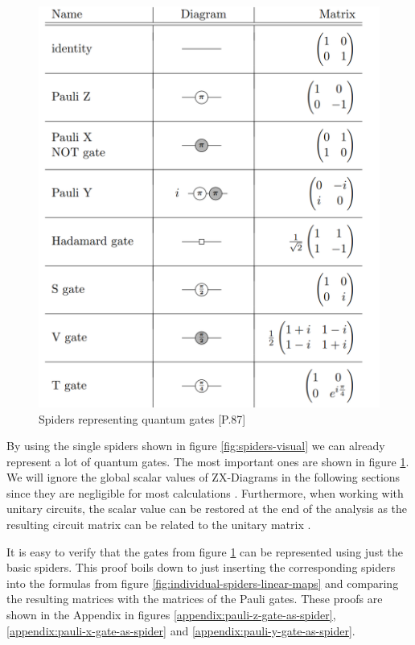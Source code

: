 \begin{figure}[h]
    \includegraphics[width=\linewidth]{images/single_spider_unitaries.png}
    \caption{Spiders representing quantum gates
            {\cite{vandewetering2020zxcalculus}[P.87]}}
    \label{fig:spiders-gate-representation}
\end{figure}

By using the single spiders shown in figure \ref{fig:spiders-visual} we can already represent a lot of quantum gates. The most important ones are shown in figure \ref{fig:spiders-gate-representation}. We will ignore the global scalar values of ZX-Diagrams in the following sections since they are negligible for most calculations \cite{equivalence_checking_tum}. Furthermore, when working with unitary circuits, the scalar value can be restored at the end of the analysis as the resulting circuit matrix can be related to the unitary matrix \cite{vandewetering2020zxcalculus}.

It is easy to verify that the gates from figure \ref{fig:spiders-gate-representation} can be represented using just the basic spiders. This proof boils down to just inserting the corresponding spiders into the formulas from figure \ref{fig:individual-spiders-linear-maps} and comparing the resulting matrices with the matrices of the Pauli gates.
These proofs are shown in the Appendix in figures \ref{appendix:pauli-z-gate-as-spider}, \ref{appendix:pauli-x-gate-as-spider} and \ref{appendix:pauli-y-gate-as-spider}.

